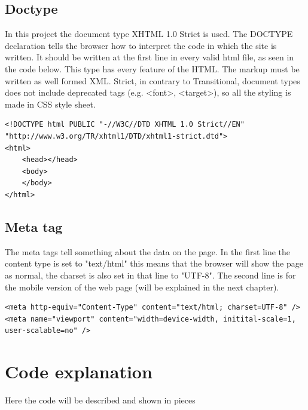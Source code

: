 \subsection{Doctype}
In this project the document type XHTML 1.0 Strict is used. The DOCTYPE declaration tells the browser how to interpret the code in which the site is written. It should be written at the first line in every valid html file, as seen in the code below. This type has every feature of the HTML. The markup must be written as well formed XML. Strict, in contrary to Transitional, document types does not include deprecated tags (e.g. \textless font\textgreater , \textless target\textgreater), so all the styling is made in CSS style sheet.
\begin{lstlisting}
<!DOCTYPE html PUBLIC "-//W3C//DTD XHTML 1.0 Strict//EN" "http://www.w3.org/TR/xhtml1/DTD/xhtml1-strict.dtd">
<html>
	<head></head>
	<body>
	</body>
</html>
\end{lstlisting}

\subsection{Meta tag}
The meta tags tell something about the data on the page. In the first line the content type is set to "text/html" this means that the browser will show the page as normal, the charset is also set in that line to "UTF-8". The second line is for the mobile version of the web page (will be explained in the next chapter).
\begin{lstlisting}
<meta http-equiv="Content-Type" content="text/html; charset=UTF-8" />
<meta name="viewport" content="width=device-width, initital-scale=1, user-scalable=no" />
\end{lstlisting}

\section{Code explanation}
Here the code will be described and shown in pieces

